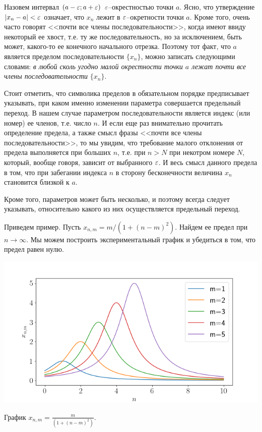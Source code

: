 \begin{enumerate}
Назовем интервал $(a-\varepsilon;a+\varepsilon)$ $\varepsilon$--окрестностью точки $a$. Ясно, что утверждение $|x_n-a|<\varepsilon$ означает, что $x_n$ лежит в $\varepsilon$--окретности точки $a$. Кроме того, очень часто говорят <<почти все члены последовательности>>, когда имеют ввиду некоторый ее хвост, т.е. ту же последовательность, но за исключением, быть может, какого-то ее конечного начального отрезка. Поэтому тот факт, что $a$ является пределом последовательности $\{x_n\}$, можно записать следующими словами: \textit{в любой сколь угодно малой окрестности точки $a$ лежат почти все члены последовательности} $\{x_n\}$.

Стоит отметить, что символика пределов в обязательном порядке предписывает указывать, при каком именно изменении параметра совершается предельный переход. В нашем случае параметром последовательности является индекс (или номер) ее членов, т.е. число $n$. И если еще раз внимательно прочитать определение предела, а также смысл фразы <<почти все члены последовательности>>, то мы увидим, что требование малого отклонения от предела выполняется при больших $n$, т.е. при $n>N$ при некотром номере $N$, который, вообще говоря, зависит от выбранного $\varepsilon$. И весь смысл данного предела в том, что при забегании индекса $n$ в сторону бесконечности величина $x_n$ становится близкой к $a$.

Кроме того, параметров может быть несколько, и поэтому всегда следует указывать, относительно какого из них осуществляется предельный переход.

Приведем пример. Пусть $x_{n,m}=m/(1+(n-m)^2)$. Найдем ее предел при $n\to\infty$. Мы можем построить экспериментальный график и убедиться в том, что предел равен нулю.
\begin{center}
\includegraphics[scale=0.5]{limits.png}

График $\displaystyle x_{n,m}=\frac{m}{(1+(n-m)^2)}$.
\end{center}


\end{enumerate}
